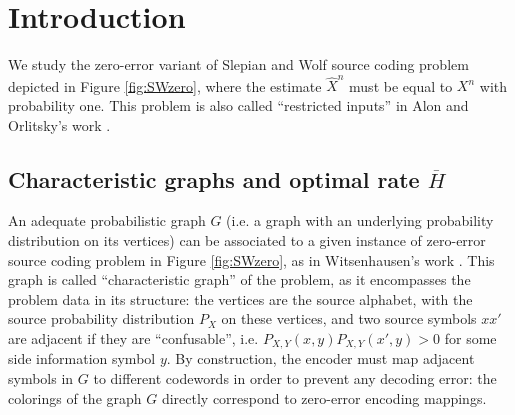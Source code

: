 \documentclass[conference,a4paper]{IEEEtran}
\def\ar#1{\textcolor{red}{\footnotesize {(ar: #1)}}}
\begin{document}
\begin{abstract}


\end{abstract}

\section{Introduction}\label{section:intro}

We study the zero-error variant of Slepian and Wolf source coding problem depicted in Figure \ref{fig:SWzero}, where the estimate $\widehat{X}^n$ must be equal to $X^n$ with probability one. This problem is also called ``restricted inputs'' in Alon and Orlitsky's work \cite{alon1996source}. %

\subsection{Characteristic graphs and optimal rate $\overline{H}$}

An adequate probabilistic graph $G$ (i.e. a graph with an underlying probability distribution on its vertices) can be associated to a given instance of zero-error source coding problem in Figure \ref{fig:SWzero}, as in Witsenhausen's work \cite{witsenhausen1976zero}. This graph is called ``characteristic graph'' of the problem, as it encompasses the problem data in its structure: the vertices are the source alphabet, with the source probability distribution $P_X$ on these vertices, and two source symbols $xx'$ are adjacent if they are ``confusable'', i.e. $P_{X,Y}(x,y)P_{X,Y}(x',y) > 0$ for some side information symbol $y$. By construction, the encoder must map adjacent symbols in $G$ to different codewords in order to prevent any decoding error: the colorings of the graph $G$ directly correspond to zero-error encoding mappings.
\end{document}
